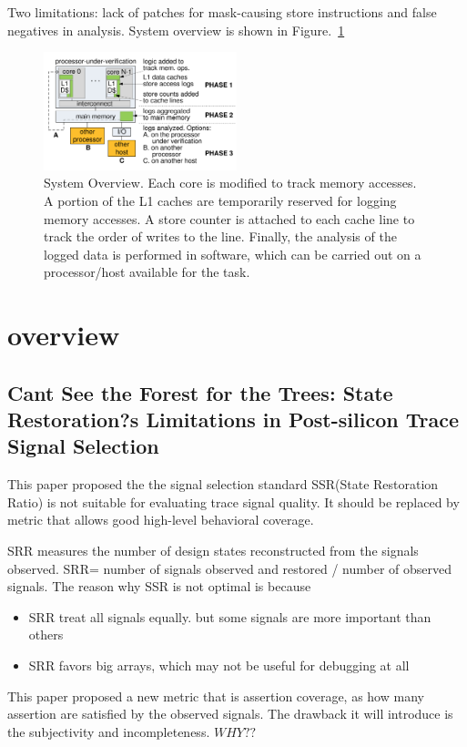 \documentclass[conference]{IEEEtran}
\begin{document}
Two limitations: lack of patches for mask-causing store instructions and false negatives in analysis.
System overview is shown in Figure.~\ref{systemoverview}
\begin{figure}
\includegraphics[width=0.5\textwidth]{systemoverview.png}
\caption{System Overview. Each core is modified to track memory accesses.
A portion of the L1 caches are temporarily reserved for logging memory accesses. A store counter is attached to each cache line to track the order of writes to the line. Finally, the analysis of the logged data is performed in software, which can be carried out on a processor/host available for the task.}
\label{systemoverview}
\end{figure}
\section{overview}
\subsection{Cant See the Forest for the Trees: State Restoration?s Limitations in Post-silicon Trace Signal Selection ~\cite{forestMa}}
This paper proposed the the signal selection standard SSR(State Restoration Ratio) is not suitable for evaluating trace signal quality. It should be replaced by metric that allows good high-level behavioral coverage.

SRR measures the number of design states reconstructed from the signals observed. SRR= number of signals observed and restored / number of observed signals. The reason why SSR is not optimal is because 
\begin{itemize}
\item SRR treat all signals equally. but some signals are more important than others
\item SRR favors big arrays, which may not be useful for debugging at all
\end{itemize}

This paper proposed a new metric that is assertion coverage, as how many assertion are satisfied by the observed signals. The drawback it will introduce is the subjectivity and incompleteness. \(WHY??\)
\end{document}
